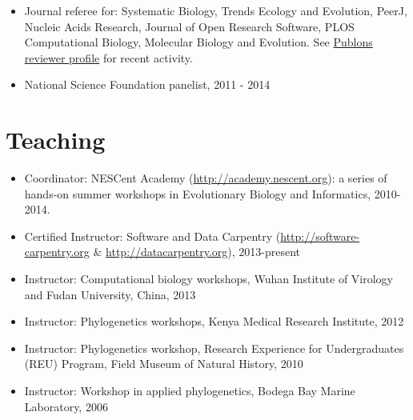 \documentclass[10pt]{article}
\begin{document}
\begin{itemize}
\item{Journal referee for: Systematic Biology, Trends Ecology and Evolution, PeerJ, Nucleic Acids Research, Journal of Open Research Software, PLOS Computational Biology, Molecular Biology and Evolution}. See \href{https://publons.com/a/213683/}{Publons reviewer profile} for recent activity. 
\item{National Science Foundation panelist, 2011 - 2014}
\end{itemize}

\section*{Teaching}
\begin{itemize}
\item{Coordinator: NESCent Academy (\url{http://academy.nescent.org}): a series of hands-on summer workshops in Evolutionary Biology and Informatics, 2010-2014.}
\item{Certified Instructor: Software and Data Carpentry (\url{http://software-carpentry.org} \& \url{http://datacarpentry.org}), 2013-present}
\item{Instructor: Computational biology workshops, Wuhan Institute of Virology and Fudan University, China, 2013}
\item{Instructor: Phylogenetics workshops, Kenya Medical Research Institute, 2012}
\item{Instructor: Phylogenetics workshop, Research Experience for Undergraduates (REU) Program, Field Museum of Natural History, 2010}
\item{Instructor: Workshop in applied phylogenetics, Bodega Bay Marine Laboratory, 2006}
\end{itemize}
\end{document}
